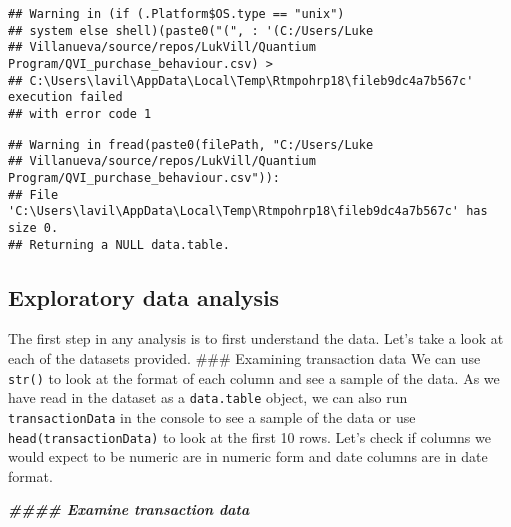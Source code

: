 \documentclass[
]{article}
\newenvironment{Shaded}{\begin{snugshade}}{\end{snugshade}}
\newcommand{\DocumentationTok}[1]{\textcolor[rgb]{0.56,0.35,0.01}{\textbf{\textit{#1}}}}
\begin{document}
\begin{verbatim}
## Warning in (if (.Platform$OS.type == "unix")
## system else shell)(paste0("(", : '(C:/Users/Luke
## Villanueva/source/repos/LukVill/Quantium Program/QVI_purchase_behaviour.csv) >
## C:\Users\lavil\AppData\Local\Temp\Rtmpohrp18\fileb9dc4a7b567c' execution failed
## with error code 1
\end{verbatim}

\begin{verbatim}
## Warning in fread(paste0(filePath, "C:/Users/Luke
## Villanueva/source/repos/LukVill/Quantium Program/QVI_purchase_behaviour.csv")):
## File 'C:\Users\lavil\AppData\Local\Temp\Rtmpohrp18\fileb9dc4a7b567c' has size 0.
## Returning a NULL data.table.
\end{verbatim}

\hypertarget{exploratory-data-analysis}{%
\subsection{Exploratory data analysis}\label{exploratory-data-analysis}}

The first step in any analysis is to first understand the data. Let's
take a look at each of the datasets provided. \#\#\# Examining
transaction data We can use \texttt{str()} to look at the format of each
column and see a sample of the data. As we have read in the dataset as a
\texttt{data.table} object, we can also run \texttt{transactionData} in
the console to see a sample of the data or use
\texttt{head(transactionData)} to look at the first 10 rows. Let's check
if columns we would expect to be numeric are in numeric form and date
columns are in date format.

\begin{Shaded}
\begin{Highlighting}[]
\DocumentationTok{\#\#\#\# Examine transaction data}
\end{Highlighting}
\end{Shaded}
\end{document}
